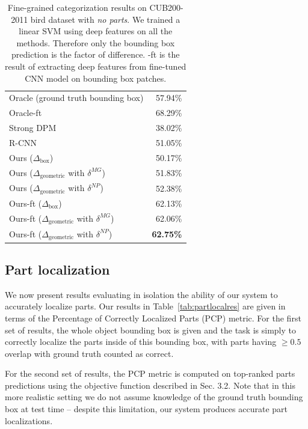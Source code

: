 \begin{table}[t]
\centering
\caption{Fine-grained categorization results on CUB200-2011 bird dataset with \emph{no parts}. We trained a linear SVM using deep features on all the methods. Therefore only the bounding box prediction is the factor of difference. -ft is the result of extracting deep features from fine-tuned CNN model on bounding box patches. } \label{tab:finegrained_noparts}
\begin{tabular}{|l|r|}
\hline
Oracle (ground truth bounding box) & 57.94\%\\
Oracle-ft & 68.29\% \\
\hline 
Strong DPM \cite{Hossein_ECCV12} & 38.02\% \\
R-CNN~\cite{rcnn} & 51.05\% \\
\hline \hline
Ours ($\Delta_{\mathrm{box}}$)  & 50.17\% \\
Ours ($\Delta_{\mathrm{geometric}}$ with $\delta^{MG}$) & 51.83\% \\
Ours ($\Delta_{\mathrm{geometric}}$ with $\delta^{NP}$) & 52.38\%\\
Ours-ft ($\Delta_{\mathrm{box}}$)  &  62.13\%\\
Ours-ft ($\Delta_{\mathrm{geometric}}$ with $\delta^{MG}$) & 62.06\% \\
Ours-ft ($\Delta_{\mathrm{geometric}}$ with $\delta^{NP}$) & \textbf{62.75\%} \\
\hline
\end{tabular}
\end{table}

\subsection{Part localization}
We now present results evaluating in isolation the ability of our system to accurately localize parts.
Our results in Table~\ref{tab:partlocalres} are given in terms of the Percentage of Correctly Localized Parts (PCP) metric. 
For the first set of results, the whole object bounding box is given and the task is simply to correctly localize the parts inside of this bounding box, with parts having $\ge 0.5$ overlap with ground truth counted as correct.

For the second set of results, the PCP metric is computed on top-ranked parts predictions using the objective function described in Sec. 3.2.
Note that in this more realistic setting we do not assume knowledge of the ground truth bounding box at test time -- despite this limitation, our system produces accurate part localizations.

